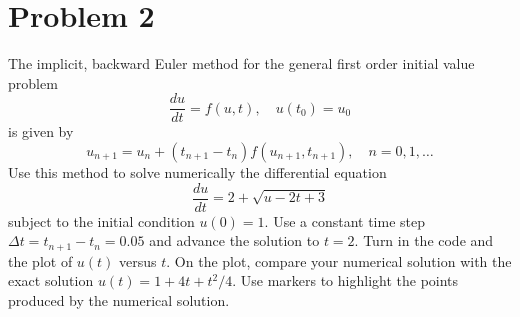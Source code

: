 \section{Problem 2}%
\label{sec:problem_2}
The implicit, backward Euler method for the general first order initial value problem
\begin{equation*}
  \frac{du}{dt} = f(u, t), \quad u(t_{0}) = u_{0}
\end{equation*}
is given by
\begin{equation*}
  u_{n + 1} = u_{n} + (t_{n + 1} - t_{n}) f(u_{n + 1}, t_{n + 1}), \quad n = 0, 1, \ldots
\end{equation*}
Use this method to solve numerically the differential equation
\begin{equation*}
  \frac{du}{dt} = 2 + \sqrt{u - 2t + 3}
\end{equation*}
subject to the initial condition $u(0) = 1$. Use a constant time step $\Delta t = t_{n + 1} - t_{n} = 0.05$ and advance the solution to $t = 2$. Turn in the code and the plot of $u(t)$ versus $t$. On the plot, compare your numerical solution with the exact solution $u(t) = 1 + 4t + t^{2} / 4$. Use markers to highlight the points produced by the numerical solution.

